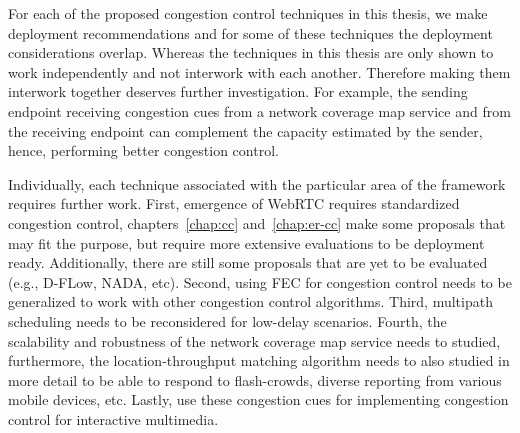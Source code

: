 




For each of the proposed congestion control techniques in this thesis, we make
deployment recommendations and for some of these techniques the deployment
considerations overlap. Whereas the techniques in this thesis are only shown
to work independently and not interwork with each another. Therefore making
them interwork together deserves further investigation. For example, the
sending endpoint receiving congestion cues from a network coverage map service
and from the receiving endpoint can complement the capacity estimated by the
sender, hence, performing better congestion control.

Individually, each technique associated with the particular area of the
framework requires further work. First, emergence of WebRTC requires
standardized congestion control, chapters~\ref{chap:cc} and~\ref{chap:er-cc}
make some proposals that may fit the purpose, but require more extensive
evaluations to be deployment ready. Additionally, there are still some
proposals that are yet to be evaluated (e.g., D-FLow, NADA, etc). Second,
using FEC for congestion control needs to be generalized to work with other
congestion control algorithms. Third, multipath scheduling needs to be
reconsidered for low-delay scenarios. Fourth, the scalability and robustness
of the network coverage map service needs to studied, furthermore, the
location-throughput matching algorithm needs to also studied in more detail to
be able to respond to flash-crowds, diverse reporting from various mobile
devices, etc. Lastly, use these congestion cues for implementing congestion
control for interactive multimedia.


